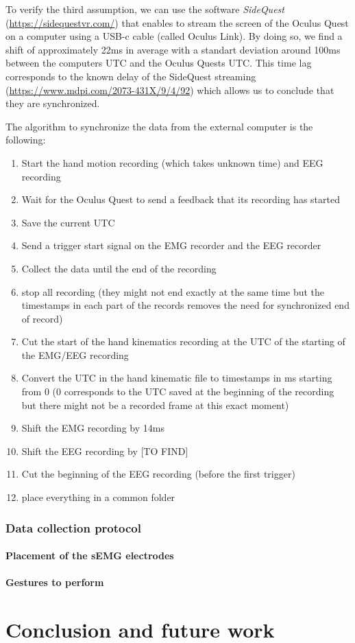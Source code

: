 \documentclass{article}
\begin{document}
To verify the third assumption, we can use the software \textit{SideQuest} (\url{https://sidequestvr.com/}) that enables to stream the screen of the Oculus Quest on a computer using a USB-c cable (called Oculus Link). By doing so, we find a shift of approximately 22ms in average with a standart deviation around 100ms between the computers UTC and the Oculus Quests UTC. This time lag corresponds to the known delay of the SideQuest streaming (\url{https://www.mdpi.com/2073-431X/9/4/92}) which allows us to conclude that they are synchronized.

The algorithm to synchronize the data from the external computer is the following:
\begin{enumerate}
    \item Start the hand motion recording (which takes unknown time) and EEG recording
    \item Wait for the Oculus Quest to send a feedback that its recording has started
    \item Save the current UTC
    \item Send a trigger start signal on the EMG recorder and the EEG recorder
    \item Collect the data until the end of the recording
    \item stop all recording (they might not end exactly at the same time but the timestamps in each part of the records removes the need for synchronized end of record)
    \item Cut the start of the hand kinematics recording at the UTC of the starting of the EMG/EEG recording
    \item Convert the UTC in the hand kinematic file to timestamps in ms starting from 0 (0 corresponds to the UTC saved at the beginning of the recording but there might not be a recorded frame at this exact moment)
    \item Shift the EMG recording by 14ms
    \item Shift the EEG recording by \color{red} [TO FIND] \color{black}
    \item Cut the beginning of the EEG recording (before the first trigger)
    \item place everything in a common folder
\end{enumerate}



\section{Data collection protocol}

\subsection{Placement of the sEMG electrodes}

\subsection{Gestures to perform}



\part{Conclusion and future work}




\cite{*}
\end{document}
